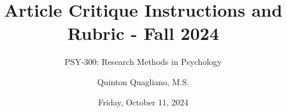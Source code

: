 \documentclass[
  12pt,
  letterpaper,
]{scrartcl}
\title{Article Critique Instructions and Rubric - Fall 2024}
\subtitle{PSY-300: Research Methods in Psychology}
\author{Quinton Quagliano, M.S.}
\date{Friday, October 11, 2024}
\begin{document}


\begin{titlepage}


\newcommand{\titlepagepagealign}{
\ifthenelse{\equal{center}{right}}{\raggedleft}{}
\ifthenelse{\equal{center}{center}}{\centering}{}
\ifthenelse{\equal{center}{left}}{\raggedright}{}
}


\newcommand{\titleandsubtitle}{
{{\huge{\bfseries{\nohyphens{Article Critique Instructions and Rubric -
Fall 2024}}}}\par
}%

\vspace{\betweentitlesubtitle}
{
{\Large{\nohyphens{PSY-300: Research Methods in Psychology}}}\par
}}
\newcommand{\titlepagetitleblock}{
\newcommand{\HRule}{\rule{\linewidth}{0.5mm}} 

\HRule\\[0.4cm]

\titleandsubtitle

\HRule\\
}
\newcommand{\authorstyle}[1]{{\small{#1}}}

\newcommand{\affiliationstyle}[1]{{\small{#1}}}

\newcommand{\titlepageauthorblock}{
\newlength{\miniA}
\setlength{\miniA}{0pt}
\newlength{\namelen}
\settowidth{\namelen}{Quinton Quagliano,
M.S.}\setlength{\miniA}{\maxof{\miniA}{\namelen}}
\setlength{\miniA}{\miniA+0.05\textwidth}
\newlength{\miniB}
\setlength{\miniB}{0.99\textwidth - \miniA}
\begin{minipage}{\miniA}
\begin{flushleft}
{\authorstyle{Quinton Quagliano, M.S.}}
\end{flushleft}
\end{minipage}
\begin{minipage}{\miniB}
\begin{flushright}
{\affiliationstyle{Department of Psychology
\\}}
\end{flushright}
\end{minipage}}

\newcommand{\titlepageaffiliationblock}{}
\newcommand{\headerstyled}{%
{\textsc{\LARGE{}}}
}
\newcommand{\footerstyled}{%
{}
}
\newcommand{\datestyled}{%
{\large{Friday, October 11, 2024}}
}


\newcommand{\titlepageheaderblock}{\headerstyled}


\end{titlepage}
\end{document}
